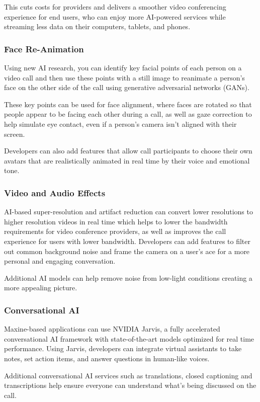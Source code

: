 This cuts costs for providers and delivers a smoother video conferencing 
experience for end users, who can enjoy more AI-powered services while streaming 
less data on their computers, tablets, and phones.

\subsubsection{Face Re-Animation}
Using new AI research, you can identify key facial points of each person on a video call 
and then use these points with a still image to reanimate a person’s face on the other side 
of the call using generative adversarial networks (GANs).

These key points can be used for face alignment, where faces are rotated so that
people appear to be facing each other during a call, as well as gaze correction 
to help simulate eye contact, even if a person’s camera isn’t aligned with their screen.

Developers can also add features that allow call participants to choose their
own avatars that are realistically animated in real time by their voice and emotional tone.

\subsubsection{Video and Audio Effects}
AI-based super-resolution and artifact reduction can convert lower resolutions to higher
resolution videos in real time which helps to lower the bandwidth requirements for video 
conference providers, as well as improves the call experience for users with lower bandwidth. 
Developers can add features to filter out common background noise and frame the camera on a user’s 
  ace for a more personal and engaging conversation.

Additional AI models can help remove noise from low-light conditions creating a more appealing picture.

\subsubsection{Conversational AI}
Maxine-based applications can use NVIDIA Jarvis, a fully accelerated conversational
AI framework with state-of-the-art models optimized for real time performance. Using Jarvis, 
developers can integrate virtual assistants to take notes, set action items, and answer questions 
in human-like voices.

Additional conversational AI services such as translations, closed captioning and transcriptions help 
ensure everyone can understand what’s being discussed on the call.

